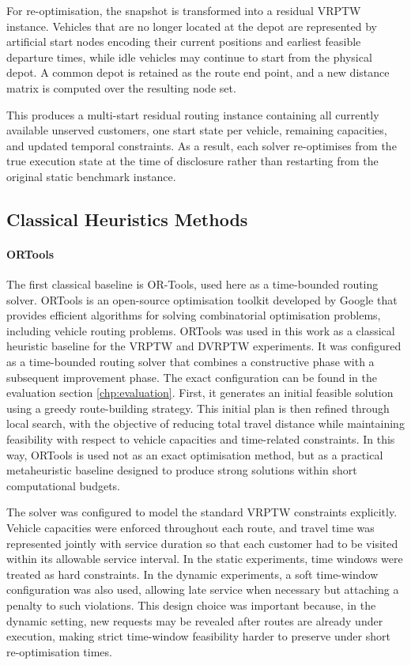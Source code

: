 For re-optimisation, the snapshot is transformed into a residual VRPTW instance.
Vehicles that are no longer located at the depot are represented by artificial
start nodes encoding their current positions and earliest feasible departure
times, while idle vehicles may continue to start from the physical depot. A
common depot is retained as the route end point, and a new distance matrix is
computed over the resulting node set.

This produces a multi-start residual routing instance containing all currently
available unserved customers, one start state per vehicle, remaining capacities,
and updated temporal constraints. As a result, each solver re-optimises from the
true execution state at the time of disclosure rather than restarting from the
original static benchmark instance.

\subsection{Classical Heuristics Methods}
\paragraph{ORTools}
The first classical baseline is OR-Tools\cite{ortools_routing}, used here as a
time-bounded routing solver. ORTools is an open-source optimisation toolkit
developed by Google that provides efficient algorithms for solving combinatorial
optimisation problems, including vehicle routing problems. ORTools was used in
this work as a classical heuristic baseline for the VRPTW and DVRPTW
experiments. It was configured as a time-bounded routing solver that combines a
constructive phase with a subsequent improvement phase. The exact configuration
can be found in the evaluation section \ref{chp:evaluation}. First, it generates
an initial feasible solution using a greedy route-building strategy. This
initial plan is then refined through local search, with the objective of
reducing total travel distance while maintaining feasibility with respect to
vehicle capacities and time-related constraints. In this way, ORTools is used
not as an exact optimisation method, but as a practical metaheuristic baseline
designed to produce strong solutions within short computational budgets.

The solver was configured to model the standard VRPTW constraints explicitly.
Vehicle capacities were enforced throughout each route, and travel time was
represented jointly with service duration so that each customer had to be
visited within its allowable service interval. In the static experiments, time
windows were treated as hard constraints. In the dynamic experiments, a soft
time-window configuration was also used, allowing late service when necessary
but attaching a penalty to such violations. This design choice was important
because, in the dynamic setting, new requests may be revealed after routes are
already under execution, making strict time-window feasibility harder to
preserve under short re-optimisation times.

